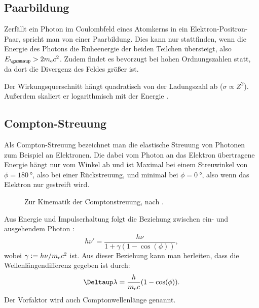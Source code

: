 \documentclass[11pt, ngerman, fleqn, DIV=15, headinclude, BCOR=2cm]{scrreprt}
\begin{document}
\subsection{Paarbildung}

Zerfällt ein Photon im Coulombfeld eines Atomkerns in ein
Elektron-Positron-Paar, spricht man von einer Paarbildung. Dies kann nur
stattfinden, wenn die Energie des Photons die Ruheenergie der beiden Teilchen
übersteigt, also $E_\gammaup > 2m_\mathrm{e}c^2$. Zudem findet es bevorzugt bei
hohen Ordnungszahlen statt, da dort die Divergenz des Feldes größer ist.

Der Wirkungsquerschnitt hängt quadratisch von der Ladungszahl ab ($\sigma
\propto Z^2$). Außerdem skaliert er logarithmisch mit der Energie
\parencite[(17.15)]{meschede-gerthsen_24}
\parencite[(2.120)]{Leo/Techniques_Nuclear_Experiments}.

\subsection{Compton-Streuung}

Als Compton-Streuung bezeichnet man die elastische Streuung von Photonen zum
Beispiel an Elektronen. Die dabei vom Photon an das Elektron übertragene
Energie hängt nur vom Winkel ab und ist Maximal bei einem Streuwinkel von $\phi
= \SI{180}\degree$, also bei einer Rückstreuung, und minimal bei $\phi =
\SI{0}\degree$, also wenn das Elektron nur gestreift wird.

\begin{figure}[htbp]
    \centering
    \caption{%
        Zur Kinematik der Comptonstreuung, nach
        \parencite[Abbildung~2.22]{Leo/Techniques_Nuclear_Experiments}.
    }
    \label{fig:}
\end{figure}

Aus Energie und Impulserhaltung folgt die Beziehung zwischen ein- und
ausgehendem Photon \parencite[(2.106)]{Leo/Techniques_Nuclear_Experiments}:
\[
    h\nu' = \frac{h\nu}{1 + \gamma(1 - \cos(\phi))},
\]
wobei $\gamma := h \nu / m_\text e c^2$ ist. Aus dieser Beziehung kann man
herleiten, dass die Wellenlängendifferenz gegeben ist durch:
\[
    \Deltaup \lambda = \frac{h}{m_\text e c} (1 - \cos(\phi)).
\]
Der Vorfaktor wird auch Comptonwellenlänge genannt.
\end{document}
